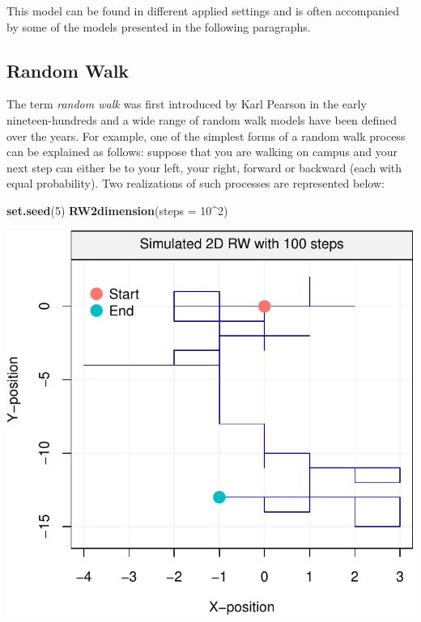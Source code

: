 \documentclass[]{book}
\newenvironment{Shaded}{\begin{snugshade}}{\end{snugshade}}
\newcommand{\KeywordTok}[1]{\textcolor[rgb]{0.13,0.29,0.53}{\textbf{#1}}}
\newcommand{\DataTypeTok}[1]{\textcolor[rgb]{0.13,0.29,0.53}{#1}}
\newcommand{\DecValTok}[1]{\textcolor[rgb]{0.00,0.00,0.81}{#1}}
\newcommand{\OperatorTok}[1]{\textcolor[rgb]{0.81,0.36,0.00}{\textbf{#1}}}
\newcommand{\NormalTok}[1]{#1}
\theoremstyle{definition}
\theoremstyle{definition}
\theoremstyle{definition}
\theoremstyle{remark}
\begin{document}
This model can be found in different applied settings and is often
accompanied by some of the models presented in the following paragraphs.

\subsection{Random Walk}\label{rw}

The term \emph{random walk} was first introduced by Karl Pearson in the
early nineteen-hundreds and a wide range of random walk models have been
defined over the years. For example, one of the simplest forms of a
random walk process can be explained as follows: suppose that you are
walking on campus and your next step can either be to your left, your
right, forward or backward (each with equal probability). Two
realizations of such processes are represented below:

\begin{Shaded}
\begin{Highlighting}[]
\KeywordTok{set.seed}\NormalTok{(}\DecValTok{5}\NormalTok{)}
\KeywordTok{RW2dimension}\NormalTok{(}\DataTypeTok{steps =} \DecValTok{10}\OperatorTok{^}\DecValTok{2}\NormalTok{)}
\end{Highlighting}
\end{Shaded}

\begin{center}\includegraphics{ts_files/figure-latex/RW2d-1} \end{center}
\end{document}
